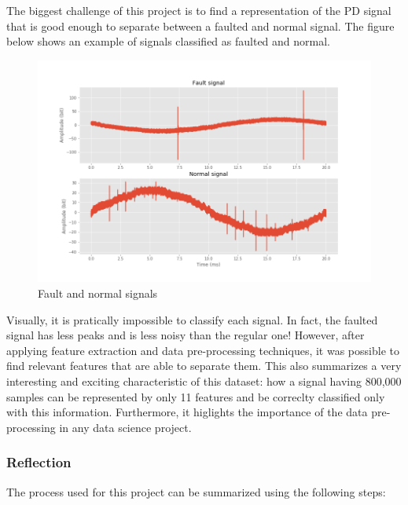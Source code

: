 \documentclass[11pt]{article}
\makeatletter
\def\maxwidth{\ifdim\Gin@nat@width>\linewidth\linewidth
    \else\Gin@nat@width\fi}
\let\Oldincludegraphics\includegraphics
\renewcommand{\includegraphics}[1]{\Oldincludegraphics[width=.8\maxwidth]{#1}}
\makeatother
\begin{document}
The biggest challenge of this project is to find a representation of the
PD signal that is good enough to separate between a faulted and normal
signal. The figure below shows an example of signals classified as
faulted and normal.

\begin{figure}
\centering
\includegraphics{signal_fault_normal_raw_freeform.png}
\caption{Fault and normal signals}
\end{figure}

Visually, it is pratically impossible to classify each signal. In fact,
the faulted signal has less peaks and is less noisy than the regular
one! However, after applying feature extraction and data pre-processing
techniques, it was possible to find relevant features that are able to
separate them. This also summarizes a very interesting and exciting
characteristic of this dataset: how a signal having 800,000 samples can
be represented by only 11 features and be correclty classified only with
this information. Furthermore, it higlights the importance of the data
pre-processing in any data science project.

\hypertarget{reflection}{%
\subsubsection{Reflection}\label{reflection}}

The process used for this project can be summarized using the following
steps:
\end{document}
